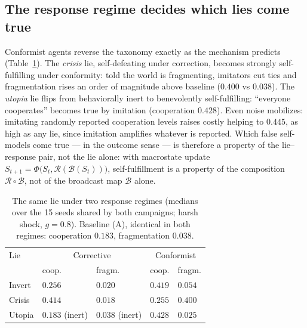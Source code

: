 \documentclass{svproc}
\begin{document}
\subsection{The response regime decides which lies come true}
\label{sec:regime}
Conformist agents reverse the taxonomy exactly as the mechanism predicts
(Table~\ref{tab:regime}). The \emph{crisis} lie, self-defeating under
correction, becomes strongly self-fulfilling under conformity: told the world
is fragmenting, imitators cut ties and fragmentation rises an order of
magnitude above baseline ($0.400$ vs $0.038$). The \emph{utopia} lie flips from behaviorally inert to benevolently
self-fulfilling: ``everyone cooperates'' becomes true by imitation
(cooperation $0.428$). Even noise mobilizes: imitating randomly reported
cooperation levels raises costly helping to $0.445$, as high as any lie,
since imitation amplifies whatever is reported. Which false self-models come
true --- in the outcome sense --- is therefore a property of the lie--response
pair, not the lie alone: with macrostate update
$S_{t+1}=\Phi\big(S_t, \mathcal{R}(\mathcal{B}(S_t))\big)$, self-fulfillment
is a property of the composition $\mathcal{R}\circ\mathcal{B}$, not of the
broadcast map $\mathcal{B}$ alone.

\begin{table}[t]
\centering\footnotesize
\caption{The same lie under two response regimes (medians over the 15 seeds
shared by both campaigns; harsh shock, $g=0.8$). Baseline (A), identical in
both regimes: cooperation $0.183$, fragmentation $0.038$.}
\label{tab:regime}
\renewcommand{\arraystretch}{0.92}
\begin{tabular}{@{}lllll@{}}
\toprule
Lie & \multicolumn{2}{c}{Corrective} & \multicolumn{2}{c}{Conformist}\\
 & coop. & fragm. & coop. & fragm.\\
\midrule
Invert & $0.256$ & $0.020$ & $0.419$ & $0.054$\\
Crisis & $0.414$ & $0.018$ & $0.255$ & $\mathbf{0.400}$\\
Utopia & $0.183$ (inert) & $0.038$ (inert) & $\mathbf{0.428}$ & $0.025$\\
\bottomrule
\end{tabular}
\end{table}
\end{document}
